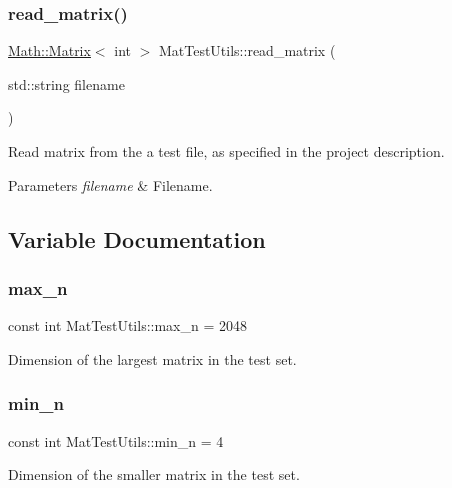 \subsubsection{\texorpdfstring{read\+\_\+matrix()}{read\_matrix()}}
{\footnotesize\ttfamily \mbox{\hyperlink{classMath_1_1Matrix}{Math\+::\+Matrix}}$<$ int $>$ Mat\+Test\+Utils\+::read\+\_\+matrix (\begin{DoxyParamCaption}\item[{std\+::string}]{filename }\end{DoxyParamCaption})}



Read matrix from the a test file, as specified in the project description. 


\begin{DoxyParams}{Parameters}
{\em filename} & Filename. \\
\hline
\end{DoxyParams}


\subsection{Variable Documentation}
\mbox{\label{namespaceMatTestUtils_aae57ce6440d799106e6f95f6094b2d6d}} 
\subsubsection{\texorpdfstring{max\+\_\+n}{max\_n}}
{\footnotesize\ttfamily const int Mat\+Test\+Utils\+::max\+\_\+n = 2048}

Dimension of the largest matrix in the test set. \mbox{\label{namespaceMatTestUtils_ac809b72319e3d38f960650baf31dc1e6}} 
\subsubsection{\texorpdfstring{min\+\_\+n}{min\_n}}
{\footnotesize\ttfamily const int Mat\+Test\+Utils\+::min\+\_\+n = 4}

Dimension of the smaller matrix in the test set. 